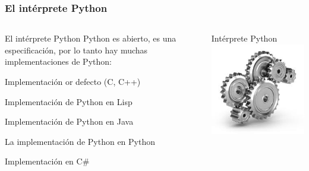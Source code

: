 \documentclass[10pt,colorlinks]{beamer}
\begin{document}
\begin{frame}[fragile]\frametitle{El intérprete Python}
 
 \begin{columns}[T]
    \begin{column}{.7\textwidth}
        \begin{block}{\centering El intérprete Python}
\small Python es abierto, es una especificación, por lo tanto hay muchas implementaciones de Python:
\begin{description}
\scriptsize    
    \item[CPython] Implementación or defecto (C, C++)
    \item[CLPython] Implementación de Python en Lisp
    \item[Jython] Implementación de Python en Java
    \item[PyPy] La implementación de Python en Python
    \item [IronPython] Implementación en C\# 
\end{description}
        \end{block}
    \end{column}
    \begin{column}{.3\textwidth}
\begin{center}
Intérprete Python
\includegraphics[scale=0.3]{figs/gears.jpg}
\end{center}    
    \end{column}
  \end{columns}
\end{frame}
\end{document}

